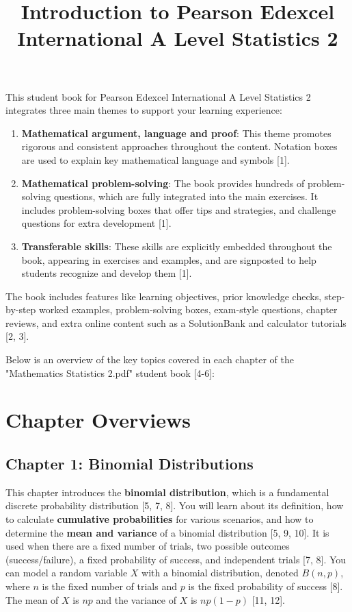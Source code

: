 \documentclass{article}
\title{\textbf{Introduction to Pearson Edexcel International A Level Statistics 2}}
\author{} %
\date{} %
\begin{document}
\maketitle

This student book for Pearson Edexcel International A Level Statistics 2 integrates three main themes to support your learning experience:
\begin{enumerate}
    \item \textbf{Mathematical argument, language and proof}: This theme promotes rigorous and consistent approaches throughout the content. Notation boxes are used to explain key mathematical language and symbols [1].
    \item \textbf{Mathematical problem-solving}: The book provides hundreds of problem-solving questions, which are fully integrated into the main exercises. It includes problem-solving boxes that offer tips and strategies, and challenge questions for extra development [1].
    \item \textbf{Transferable skills}: These skills are explicitly embedded throughout the book, appearing in exercises and examples, and are signposted to help students recognize and develop them [1].
\end{enumerate}
The book includes features like learning objectives, prior knowledge checks, step-by-step worked examples, problem-solving boxes, exam-style questions, chapter reviews, and extra online content such as a SolutionBank and calculator tutorials [2, 3].

Below is an overview of the key topics covered in each chapter of the "Mathematics Statistics 2.pdf" student book [4-6]:

\section*{Chapter Overviews}

\subsection*{Chapter 1: Binomial Distributions}
This chapter introduces the \textbf{binomial distribution}, which is a fundamental discrete probability distribution [5, 7, 8]. You will learn about its definition, how to calculate \textbf{cumulative probabilities} for various scenarios, and how to determine the \textbf{mean and variance} of a binomial distribution [5, 9, 10]. It is used when there are a fixed number of trials, two possible outcomes (success/failure), a fixed probability of success, and independent trials [7, 8]. You can model a random variable $X$ with a binomial distribution, denoted $B(n, p)$, where $n$ is the fixed number of trials and $p$ is the fixed probability of success [8]. The mean of $X$ is $np$ and the variance of $X$ is $np(1-p)$ [11, 12].
\end{document}
